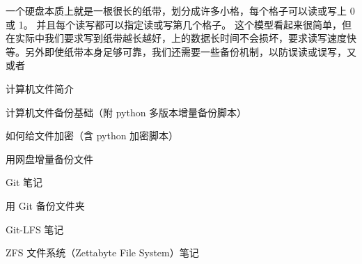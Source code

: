 
一个硬盘本质上就是一根很长的纸带，划分成许多小格，每个格子可以读或写上 0 或 1。 并且每个读写都可以指定读或写第几个格子。 这个模型看起来很简单，但在实际中我们要求写到纸带越长越好，上的数据长时间不会损坏，要求读写速度快等。另外即使纸带本身足够可靠，我们还需要一些备份机制，以防误读或误写，又或者

计算机文件简介

计算机文件备份基础（附 python 多版本增量备份脚本）

如何给文件加密（含 python 加密脚本）

用网盘增量备份文件

Git 笔记

用 Git 备份文件夹

Git-LFS 笔记

ZFS 文件系统（Zettabyte File System）笔记
